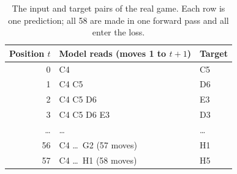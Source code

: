 \documentclass[11pt]{scrartcl}
\begin{document}
\begin{table}[H]
    \centering
    \small
    \begin{tabular}{r l l}
    \toprule
    Position $t$ & Model reads (moves 1 to $t+1$) & Target \\
    \midrule
    0 & C4 & C5 \\
    1 & C4 C5 & D6 \\
    2 & C4 C5 D6 & E3 \\
    3 & C4 C5 D6 E3 & D3 \\
    \dots & \dots & \dots \\
    56 & C4 \dots\ G2 (57 moves) & H1 \\
    57 & C4 \dots\ H1 (58 moves) & H5 \\
    \bottomrule
    \end{tabular}
    \caption{The input and target pairs of the real game. Each row is one prediction; all 58 are made in one
    forward pass and all enter the loss.}
    \label{tab:pairs}
\end{table}
\end{document}
